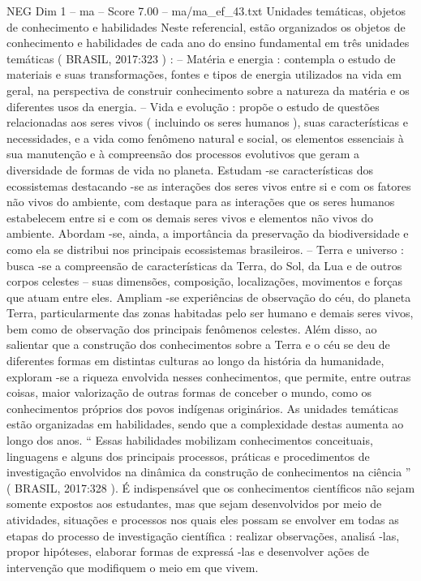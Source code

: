 \begin{textsample}{NEG Dim 1 – ma – Score 7.00 – ma/ma\_ef\_43.txt}  \label{ex:f1_neg_228}
Unidades temáticas, objetos de conhecimento e habilidades Neste referencial, estão organizados os objetos de conhecimento e habilidades de cada ano do ensino fundamental em três unidades temáticas ( BRASIL, 2017:323 ) : – Matéria e energia : contempla o estudo de materiais e suas transformações, fontes e tipos de energia utilizados na vida em geral, na perspectiva de construir conhecimento sobre a natureza da matéria e os diferentes usos da energia. – Vida e evolução : propõe o estudo de questões relacionadas aos seres vivos ( incluindo os seres humanos ), suas características e necessidades, e a vida como fenômeno natural e social, os elementos essenciais à sua manutenção e à compreensão dos processos evolutivos que geram a diversidade de formas de vida no planeta.
Estudam -se características dos ecossistemas destacando -se as interações dos seres vivos entre si e com os fatores não vivos do ambiente, com destaque para as interações que os seres humanos estabelecem entre si e com os demais seres vivos e elementos não vivos do ambiente.
Abordam -se, ainda, a importância da preservação da biodiversidade e como ela se distribui nos principais ecossistemas brasileiros. – Terra e universo : busca -se a compreensão de características da Terra, do Sol, da Lua e de outros corpos celestes – suas dimensões, composição, localizações, movimentos e forças que atuam entre eles.
Ampliam -se experiências de observação do céu, do planeta Terra, particularmente das zonas habitadas pelo ser humano e demais seres vivos, bem como de observação dos principais fenômenos celestes.
Além disso, ao salientar que a construção dos conhecimentos sobre a Terra e o céu se deu de diferentes formas em distintas culturas ao longo da história da humanidade, exploram -se a riqueza envolvida nesses conhecimentos, que permite, entre outras coisas, maior valorização de outras formas de conceber o mundo, como os conhecimentos próprios dos povos indígenas originários.
As unidades temáticas estão organizadas em habilidades, sendo que a complexidade destas aumenta ao longo dos anos. “ Essas habilidades mobilizam conhecimentos conceituais, linguagens e alguns dos principais processos, práticas e procedimentos de investigação envolvidos na dinâmica da construção de conhecimentos na ciência ” ( BRASIL, 2017:328 ).
É indispensável que os conhecimentos científicos não sejam somente expostos aos estudantes, mas que sejam desenvolvidos por meio de atividades, situações e processos nos quais eles possam se envolver em todas as etapas do processo de investigação científica : realizar observações, analisá -las, propor hipóteses, elaborar formas de expressá -las e desenvolver ações de intervenção que modifiquem o meio em que vivem.

\end{textsample}

